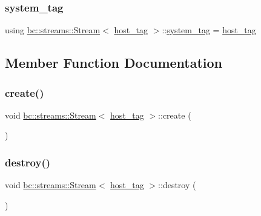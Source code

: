 \subsubsection{\texorpdfstring{system\+\_\+tag}{system\_tag}}
{\footnotesize\ttfamily using \hyperlink{classbc_1_1streams_1_1Stream}{bc\+::streams\+::\+Stream}$<$ \hyperlink{structbc_1_1host__tag}{host\+\_\+tag} $>$\+::\hyperlink{classbc_1_1streams_1_1Stream_3_01host__tag_01_4_a96382f855d558e07f52f8a324f5b13c4}{system\+\_\+tag} =  \hyperlink{structbc_1_1host__tag}{host\+\_\+tag}}



\subsection{Member Function Documentation}
\mbox{\label{classbc_1_1streams_1_1Stream_3_01host__tag_01_4_a8100f3390eec2c63d64325bd87c52599}} 
\subsubsection{\texorpdfstring{create()}{create()}}
{\footnotesize\ttfamily void \hyperlink{classbc_1_1streams_1_1Stream}{bc\+::streams\+::\+Stream}$<$ \hyperlink{structbc_1_1host__tag}{host\+\_\+tag} $>$\+::create (\begin{DoxyParamCaption}{ }\end{DoxyParamCaption})\hspace{0.3cm}{\ttfamily [inline]}}

\mbox{\label{classbc_1_1streams_1_1Stream_3_01host__tag_01_4_adf7c44baa51a5a33383817218604f732}} 
\subsubsection{\texorpdfstring{destroy()}{destroy()}}
{\footnotesize\ttfamily void \hyperlink{classbc_1_1streams_1_1Stream}{bc\+::streams\+::\+Stream}$<$ \hyperlink{structbc_1_1host__tag}{host\+\_\+tag} $>$\+::destroy (\begin{DoxyParamCaption}{ }\end{DoxyParamCaption})\hspace{0.3cm}{\ttfamily [inline]}}

